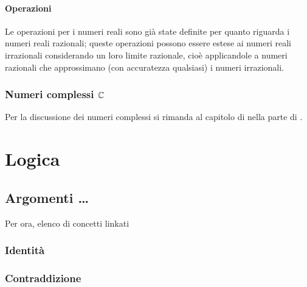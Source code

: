 \documentclass[letterpaper,10pt,italian]{jupyterBook}
\begin{document}
\subsubsection{Operazioni}
\label{\detokenize{ch/set/numeric-sets:id5}}
\sphinxAtStartPar
Le operazioni per i numeri reali sono già state definite per quanto riguarda i numeri reali razionali; queste operazioni possono essere estese ai numeri reali irrazionali considerando un loro limite razionale, cioè applicandole a numeri razionali che approssimano (con accuratezza qualsiasi) i numeri irrazionali.

\sphinxAtStartPar
{} 


\subsection{Numeri complessi \protect\(\mathbb{C}\protect\)}
\label{\detokenize{ch/set/numeric-sets:numeri-complessi-mathbb-c}}\label{\detokenize{ch/set/numeric-sets:sets-numeric-c}}
\sphinxAtStartPar
Per la discussione dei numeri complessi si rimanda al capitolo di {\hyperref[\detokenize{ch/algebra/complex-algebra:math-hs-algebra-complex}]{}} nella parte di {\hyperref[\detokenize{ch/precalculus:math-hs-precalculus}]{}}.

\sphinxstepscope


\chapter{Logica}
\label{\detokenize{ch/logics:logica}}\label{\detokenize{ch/logics:math-hs-logics}}\label{\detokenize{ch/logics::doc}}

\section{Argomenti …}
\label{\detokenize{ch/logics:argomenti}}
\sphinxAtStartPar
Per ora, elenco di concetti linkati


\subsection{Identità}
\label{\detokenize{ch/logics:logics-identity}}\label{\detokenize{ch/logics:identita}}

\subsection{Contraddizione}
\label{\detokenize{ch/logics:contraddizione}}\label{\detokenize{ch/logics:logics-contradiction}}
\end{document}
